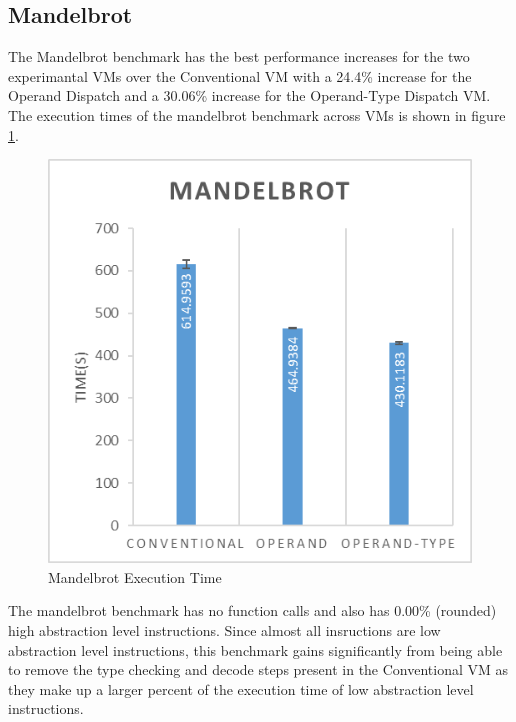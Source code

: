 \documentclass[english,a4paper,12pt]{report}
\begin{document}
\subsection{Mandelbrot}
The Mandelbrot benchmark has the best performance increases for the
two experimantal VMs over the Conventional VM with a 24.4\% increase
for the Operand Dispatch and a 30.06\% increase for the Operand-Type
Dispatch VM. The execution times of the mandelbrot benchmark across
VMs is shown in figure \ref{fig:mandel-time}.

\begin{figure}[!htb]
  \centering
  \includegraphics{mandelbrot.png}
  \caption{Mandelbrot Execution Time}
  \label{fig:mandel-time}
\end{figure}


The mandelbrot benchmark has no function calls and also has
0.00\% (rounded) high abstraction level instructions. Since almost all
insructions are low abstraction level instructions, this benchmark
gains significantly from being able to remove the type checking and
decode steps present in the Conventional VM as they make up a larger
percent of the execution time of low abstraction level instructions.
\end{document}
